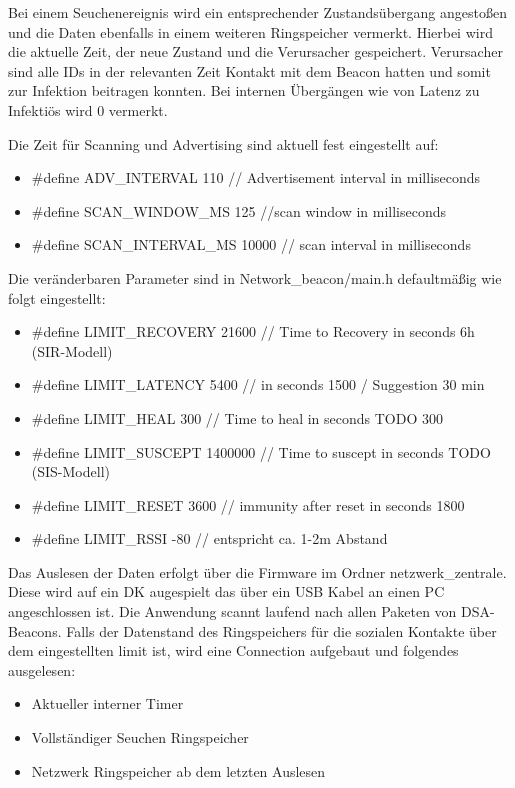 \documentclass[11pt,ngerman]{scrartcl} %
\begin{document}
Bei einem Seuchenereignis wird ein entsprechender Zustandsübergang angestoßen und die Daten ebenfalls in einem weiteren Ringspeicher vermerkt. Hierbei wird die aktuelle Zeit, der neue Zustand und die Verursacher gespeichert. Verursacher sind alle IDs in der relevanten Zeit Kontakt mit dem Beacon hatten und somit zur Infektion beitragen konnten. Bei internen Übergängen wie von Latenz zu Infektiös wird 0 vermerkt.

Die Zeit für Scanning und Advertising sind aktuell fest eingestellt auf:
\begin{itemize}
\item \#define ADV\_INTERVAL				110 // Advertisement interval in milliseconds
\item \#define SCAN\_WINDOW\_MS				125  //scan window in milliseconds
\item \#define SCAN\_INTERVAL\_MS			10000  // scan interval in milliseconds
\end{itemize}


Die veränderbaren Parameter sind in Network\_beacon/main.h defaultmäßig wie folgt eingestellt:
\begin{itemize}
\item \#define LIMIT\_RECOVERY				21600 // Time to Recovery in seconds     6h (SIR-Modell)
\item \#define LIMIT\_LATENCY				5400 //  in seconds 1500  / Suggestion 30 min
\item \#define LIMIT\_HEAL					300 // Time to heal in seconds TODO 300
\item \#define LIMIT\_SUSCEPT				1400000 // Time to suscept in seconds TODO (SIS-Modell)
\item \#define LIMIT\_RESET					3600 // immunity after reset in seconds 1800
\item \#define LIMIT\_RSSI		 			-80 // entspricht ca. 1-2m Abstand
\end{itemize}

Das Auslesen der Daten erfolgt über die Firmware im Ordner netzwerk\_zentrale. Diese wird auf ein DK augespielt das über ein USB Kabel an einen PC angeschlossen ist. Die Anwendung scannt laufend nach allen Paketen von DSA-Beacons. Falls der Datenstand des Ringspeichers für die sozialen Kontakte über dem eingestellten limit ist, wird eine Connection aufgebaut und folgendes ausgelesen:
\begin{itemize}
\item Aktueller interner Timer
\item Vollständiger Seuchen Ringspeicher
\item Netzwerk Ringspeicher ab dem letzten Auslesen
\end{itemize}
\end{document}
